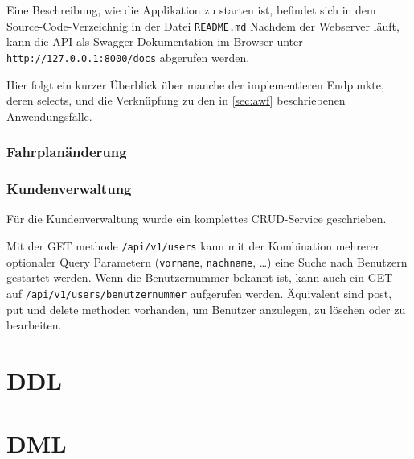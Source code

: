 Eine Beschreibung, wie die Applikation zu starten ist, befindet sich in dem Source-Code-Verzeichnig in der Datei \texttt{README.md}
Nachdem der Webserver läuft, kann die API als Swagger-Dokumentation im Browser unter \texttt{http://127.0.0.1:8000/docs} abgerufen werden.

Hier folgt ein kurzer Überblick über manche der implementieren Endpunkte, deren selects, 
und die Verknüpfung zu den in \ref{sec:awf} beschriebenen Anwendungsfälle.

\subsubsection{Fahrplanänderung}


\subsubsection{Kundenverwaltung}

Für die Kundenverwaltung wurde ein komplettes CRUD-Service geschrieben.

Mit der GET methode \texttt{/api/v1/users} kann mit der Kombination mehrerer optionaler Query Parametern 
(\texttt{vorname}, \texttt{nachname}, \dots) eine Suche nach Benutzern gestartet werden.
Wenn die Benutzernummer bekannt ist, kann auch ein GET auf \texttt{/api/v1/users/{benutzernummer}} aufgerufen werden.
Äquivalent sind post, put und delete methoden vorhanden, um Benutzer anzulegen, zu löschen oder zu bearbeiten.

\begin{appendices}
\section{DDL}\label{sec:ddl}



\section{DML}\label{sec:dml}











\end{appendices}